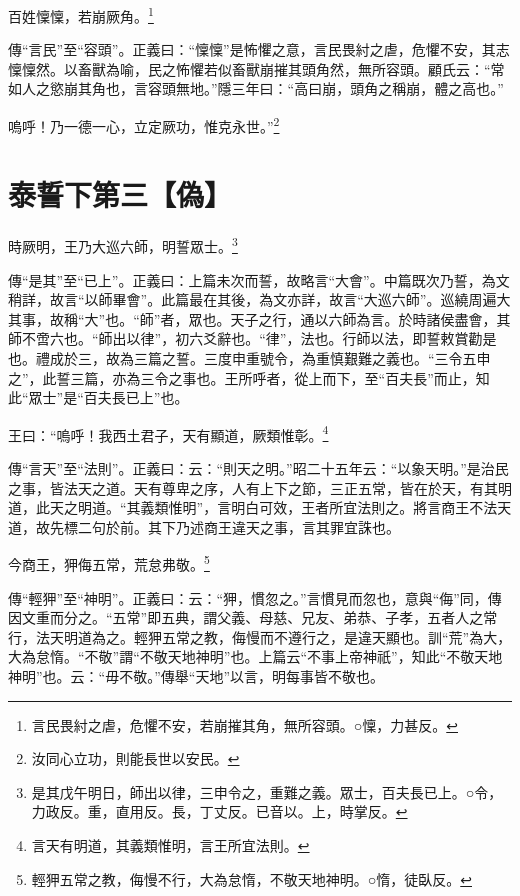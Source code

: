 百姓懍懍，若崩厥角。\footnote{言民畏紂之虐，危懼不安，若崩摧其角，無所容頭。○懍，力甚反。}

{\noindent\zhuan{}\fzbyks 傳“言民”至“容頭”。正義曰：“懍懍”是怖懼之意，言民畏紂之虐，危懼不安，其志懍懍然。以畜獸為喻，民之怖懼若似畜獸崩摧其頭角然，無所容頭。顧氏云：“常如人之慾崩其角也，言容頭無地。”隱三年曰：“高曰崩，頭角之稱崩，體之高也。” \par}

嗚呼！乃一德一心，立定厥功，惟克永世。”\footnote{汝同心立功，則能長世以安民。}

\section{泰誓下第三【偽】}


時厥明，王乃大巡六師，明誓眾士。\footnote{是其戊午明日，師出以律，三申令之，重難之義。眾士，百夫長已上。○令，力政反。重，直用反。長，丁丈反。已音以。上，時掌反。}

{\noindent\zhuan{}\fzbyks 傳“是其”至“已上”。正義曰：上篇未次而誓，故略言“大會”。中篇既次乃誓，為文稍詳，故言“以師畢會”。此篇最在其後，為文亦詳，故言“大巡六師”。巡繞周遍大其事，故稱“大”也。“師”者，眾也。天子之行，通以六師為言。於時諸侯盡會，其師不啻六也。“師出以律”，初六爻辭也。“律”，法也。行師以法，即誓敕賞勸是也。禮成於三，故為三篇之誓。三度申重號令，為重慎艱難之義也。“三令五申之”，此誓三篇，亦為三令之事也。王所呼者，從上而下，至“百夫長”而止，知此“眾士”是“百夫長已上”也。 \par}

王曰：“嗚呼！我西土君子，天有顯道，厥類惟彰。\footnote{言天有明道，其義類惟明，言王所宜法則。}

{\noindent\zhuan{}\fzbyks 傳“言天”至“法則”。正義曰：云：“則天之明。”昭二十五年云：“以象天明。”是治民之事，皆法天之道。天有尊卑之序，人有上下之節，三正五常，皆在於天，有其明道，此天之明道。“其義類惟明”，言明白可效，王者所宜法則之。將言商王不法天道，故先標二句於前。其下乃述商王違天之事，言其罪宜誅也。 \par}

今商王，狎侮五常，荒怠弗敬。\footnote{輕狎五常之教，侮慢不行，大為怠惰，不敬天地神明。○惰，徒臥反。}

{\noindent\zhuan{}\fzbyks 傳“輕狎”至“神明”。正義曰：云：“狎，慣忽之。”言慣見而忽也，意與“侮”同，傳因文重而分之。“五常”即五典，謂父義、母慈、兄友、弟恭、子孝，五者人之常行，法天明道為之。輕狎五常之教，侮慢而不遵行之，是違天顯也。訓“荒”為大，大為怠惰。“不敬”謂“不敬天地神明”也。上篇云“不事上帝神祇”，知此“不敬天地神明”也。云：“毋不敬。”傳舉“天地”以言，明每事皆不敬也。 \par}


